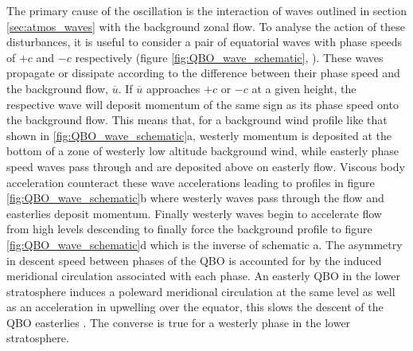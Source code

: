 The primary cause of the oscillation is the interaction of waves outlined in section \ref{sec:atmos_waves} with the background zonal flow. To analyse the action of these disturbances, it is useful to consider a pair of equatorial waves with phase speeds of $+c$ and $-c$ respectively (figure \ref{fig:QBO_wave_schematic}, \cite{plumbQuasibiennial1984}). These waves propagate or dissipate according to the difference between their phase speed and the background flow, $\overbar{u}$. If $\overbar{u}$ approaches $+c$ or $-c$ at a given height, the respective wave will deposit momentum of the same sign as its phase speed onto the background flow. This means that, for a background wind profile like that shown in \ref{fig:QBO_wave_schematic}a, westerly momentum is deposited at the bottom of a zone of westerly low altitude background wind, while easterly phase speed waves pass through and are deposited above on easterly flow. Viscous body acceleration counteract these wave accelerations leading to profiles in figure \ref{fig:QBO_wave_schematic}b where westerly waves pass through the flow and easterlies deposit momentum. Finally westerly waves begin to accelerate flow from high levels descending to finally force the background profile to figure \ref{fig:QBO_wave_schematic}d which is the inverse of schematic a. The asymmetry in descent speed between phases of the QBO is accounted for by the induced meridional circulation associated with each phase. An easterly QBO in the lower stratosphere induces a poleward meridional circulation at the same level \citep{plumb82,baldwinQuasiBiennial2001} as well as an acceleration in upwelling over the equator, this slows the descent of the QBO easterlies \citep{reedQuasiBiennial1965}. The converse is true for a westerly phase in the lower stratosphere.


